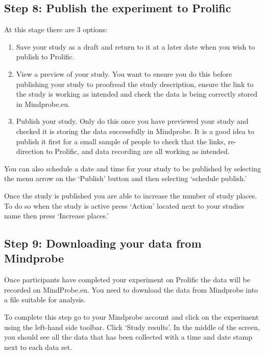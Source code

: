 \documentclass[
  12pt,
]{book}
\begin{document}
\subsection{Step 8: Publish the experiment to Prolific}\label{step-8-publish-the-experiment-to-prolific}

At this stage there are 3 options:

\begin{enumerate}
\def\labelenumi{\arabic{enumi}.}
\item
  Save your study as a draft and return to it at a later date when you wish to publish to Prolific.
\item
  View a preview of your study. You want to ensure you do this before publishing your study to proofread the study description, ensure the link to the study is working as intended and check the data is being correctly stored in Mindprobe.eu.
\item
  Publish your study. Only do this once you have previewed your study and checked it is storing the data successfully in Mindprobe. It is a good idea to publish it first for a small sample of people to check that the links, re-direction to Prolific, and data recording are all working as intended.
\end{enumerate}

You can also schedule a date and time for your study to be published by selecting the menu arrow on the `Publish' button and then selecting `schedule publish.'

Once the study is published you are able to increase the number of study places. To do so when the study is active press `Action' located next to your studies name then press `Increase places.'

\subsection{Step 9: Downloading your data from Mindprobe}\label{step-9-downloading-your-data-from-mindprobe}

Once participants have completed your experiment on Prolific the data will be recorded on MindProbe.eu. You need to download the data from Mindprobe into a file suitable for analysis.

To complete this step go to your Mindprobe account and click on the experiment using the left-hand side toolbar. Click `Study results'. In the middle of the screen, you should see all the data that has been collected with a time and date stamp next to each data set.
\end{document}
